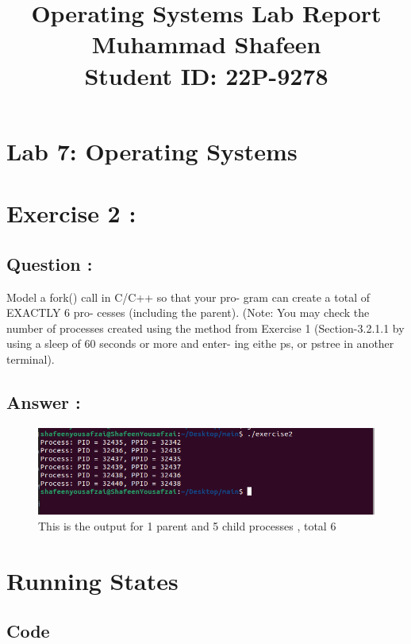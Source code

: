 \documentclass[12pt]{article}
\title{
    \vspace{-2cm} %
    \LARGE{\textbf{Operating Systems Lab Report}} \\
    \vspace{0.5cm}
    \Huge{Muhammad Shafeen} \\
    \Large{Student ID: 22P-9278}
}
\date{} %
\begin{document}
\maketitle
\thispagestyle{fancy} %

\section*{Lab 7: Operating Systems}

\section{Exercise 2 :}
\subsection{Question : }
Model a fork() call in C/C++ so that your pro-
gram can create a total of EXACTLY 6 pro-
cesses (including the parent). (Note: You may
check the number of processes created using
the method from Exercise 1 (Section-3.2.1.1 by
using a sleep of 60 seconds or more and enter-
ing eithe ps, or pstree in another terminal).
\subsection{Answer :}
\begin{figure}[H]
    \centering
    \includegraphics[width=\textwidth]{12313.png}
    \caption{This is the output for 1 parent and 5 child processes , total 6}
    \label{fig:enter-label}
\end{figure}

\section{Running States}

\subsection*{Code}
\end{document}
